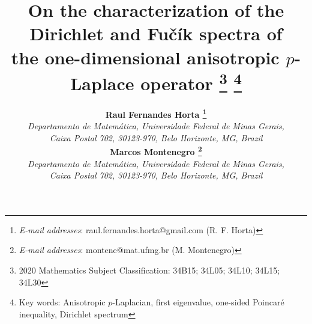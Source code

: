 \documentclass[a4paper,11pt]{article}
\title{}
\author{}
\date{}
\begin{document}
\title{On the characterization of the Dirichlet and Fu\v cík spectra of\\ the one-dimensional anisotropic $p$-Laplace operator
\footnote{2020 Mathematics Subject Classification: 34B15; 34L05; 34L10; 34L15; 34L30}
\footnote{Key words: Anisotropic $p$-Laplacian, first eigenvalue, one-sided Poincaré inequality, Dirichlet spectrum}
}

\author{\textbf{Raul Fernandes Horta \footnote{\textit{E-mail addresses}: raul.fernandes.horta@gmail.com
 (R. F. Horta)}}\\ {\small\it Departamento de Matem\'{a}tica,
Universidade Federal de Minas Gerais,}\\ {\small\it Caixa Postal
702, 30123-970, Belo Horizonte, MG, Brazil}\\
\textbf{Marcos Montenegro \footnote{\textit{E-mail addresses}:
montene@mat.ufmg.br (M. Montenegro)}}\\ {\small\it Departamento de Matem\'{a}tica,
Universidade Federal de Minas Gerais,}\\ {\small\it Caixa Postal
702, 30123-970, Belo Horizonte, MG, Brazil}}
\end{document}
